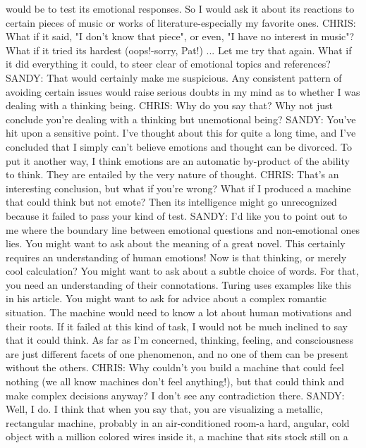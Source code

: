   would be to test its emotional responses. So I would ask it about its reactions to
   certain pieces of music or works of literature-especially my favorite ones.
CHRIS: What if it said, "I don't know that piece", or even, "I have no interest in
   music"? What if it tried its hardest (oops!-sorry, Pat!) ... Let me try that again.
   What if it did everything it could, to steer clear of emotional topics and
   references?
SANDY: That would certainly make me suspicious. Any consistent pattern of
   avoiding certain issues would raise serious doubts in my mind as to whether I
   was dealing with a thinking being.
CHRIS: Why do you say that? Why not just conclude you're dealing with a thinking
   but unemotional being?
SANDY: You've hit upon a sensitive point. I've thought about this for quite a long
   time, and I've concluded that I simply can't believe emotions and thought can be
   divorced. To put it another way, I think emotions are an automatic by-product of
   the ability to think. They are entailed by the very nature of thought.
CHRIS: That's an interesting conclusion, but what if you're wrong? What if I
   produced a machine that could think but not emote? Then its intelligence might
   go unrecognized because it failed to pass your kind of test.
SANDY: I'd like you to point out to me where the boundary line between emotional
   questions and non-emotional ones lies. You might want to ask about the meaning
   of a great novel. This certainly requires an understanding of human emotions!
   Now is that thinking, or merely cool calculation? You might want to ask about a
   subtle choice of words. For that, you need an understanding of their connotations.
   Turing uses examples like this in his article. You might want to ask for advice
   about a complex romantic situation. The machine would need to know a lot about
   human motivations and their roots. If it failed at this kind of task, I would not be
   much inclined to say that it could think. As far as I'm concerned, thinking,
   feeling, and consciousness are just different facets of one phenomenon, and no
   one of them can be present without the others.
CHRIS: Why couldn't you build a machine that could feel nothing (we all know
   machines don't feel anything!), but that could think and make complex decisions
   anyway? I don't see any contradiction there.
SANDY: Well, I do. I think that when you say that, you are visualizing a metallic,
   rectangular machine, probably in an air-conditioned room-a hard, angular, cold
   object with a million colored wires inside it, a machine that sits stock still on a
